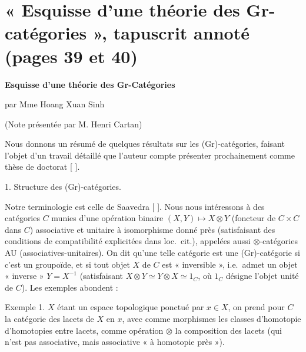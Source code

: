 \documentclass[11pt,a4paper]{article}
\begin{document}

\section*{« Esquisse d'une théorie des Gr-catégories », tapuscrit annoté
(pages 39 et 40)}


\textbf{Esquisse d'une théorie des Gr-Catégories}

par Mme Hoang Xuan Sinh

(Note présentée par M. Henri Cartan)

Nous donnons un résumé de quelques résultats sur les (Gr)-catégories,
faisant l'objet d'un travail détaillé que l'auteur compte présenter
prochainement comme thèse de doctorat [ ].

1. Structure des (Gr)-catégories.

Notre terminologie est celle de Saavedra [ ]. Nous nous intéressons à des
catégories $C$ munies d'une opération binaire $(X,Y) \mapsto X \otimes Y$
(foncteur de $C \times C$ dans $C$) associative et unitaire à isomorphisme
donné près (satisfaisant des conditions de compatibilité explicitées dans
loc.\ cit.), appelées aussi $\otimes$-catégories AU
(associatives-unitaires). On dit qu'une telle catégorie est une
(Gr)-catégorie si c'est un groupoïde, et si tout objet $X$ de $C$ est
« inversible », i.e.\ admet un objet « inverse » $Y = X^{-1}$ (satisfaisant
$X \otimes Y \simeq Y \otimes X \simeq 1_{C}$, où $1_{C}$ désigne l'objet
unité de $C$). Les exemples abondent :

Exemple 1. $X$ étant un espace topologique ponctué par $x \in X$,
on prend pour $C$ la catégorie des lacets de $X$ en $x$, avec comme
morphismes les classes d'homotopie d'homotopies entre lacets, comme
opération $\otimes$ la composition des lacets (qui n'est pas associative,
mais associative « à homotopie près »).
\end{document}
